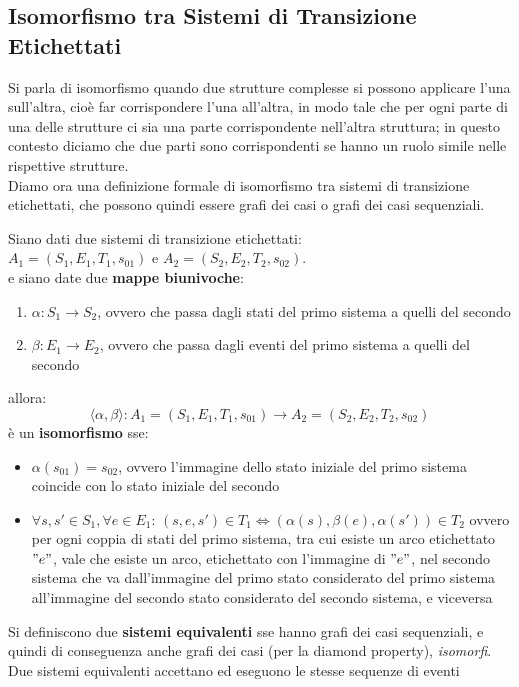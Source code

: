 \subsection{Isomorfismo tra Sistemi di Transizione Etichettati}
Si parla di isomorfismo quando due strutture complesse si possono
    applicare l'una sull'altra, cioè far corrispondere l'una all'altra, in modo
    tale che per ogni parte di una delle strutture ci sia una parte
    corrispondente nell'altra struttura; in questo contesto diciamo che due
    parti sono corrispondenti se hanno un ruolo simile nelle rispettive
    strutture.\\
Diamo ora una definizione formale di isomorfismo tra sistemi di transizione
etichettati, che possono quindi essere grafi dei casi o grafi dei casi
sequenziali.
\begin{definizione}
  Siano dati due sistemi di transizione etichettati:\\
  $A_1 = (S_1, E_1, T_1, s_{01})$ e $A_2 = (S_2 , E_2 , T_2 , s_{02})$.\\
  e siano date due \textbf{mappe biunivoche}:
  \begin{enumerate}
    \item $\alpha:S_1\to S_2$, ovvero che passa dagli stati del primo sistema a
    quelli del secondo
    \item $\beta:E_1\to E_2$, ovvero che passa dagli eventi del primo sistema a
    quelli del secondo
  \end{enumerate}
  allora:
  \[\langle \alpha,\beta\rangle:A_1= (S_1 , E_1 , T_1 , s_{01})\to A_2 = (S_2 ,
    E_2 , T_2 , s_{02})\]
  è un \textbf{isomorfismo} sse:
  \begin{itemize}
    \item $\alpha(s_{01})=s_{02}$, ovvero l'immagine dello stato iniziale del
    primo sistema coincide con lo stato iniziale del secondo
    \item $\forall s, s'\in S_1,\forall e\in E_1:\,(s, e, s')\in T_1
    \Leftrightarrow (\alpha(s),\beta(e),\alpha(s'))\in T_2$ ovvero per ogni
    coppia di stati del primo sistema, tra cui esiste un arco etichettato $"e"$,
    vale che esiste un arco, etichettato con l'immagine di $"e"$, nel secondo
    sistema che va dall'immagine del primo stato considerato del primo sistema
    all'immagine del secondo stato considerato del secondo sistema, e viceversa
  \end{itemize}
\end{definizione} \vspace{5mm} %
\begin{definizione}
  Si definiscono due \textbf{sistemi equivalenti} sse hanno grafi dei casi
  sequenziali, e quindi di conseguenza anche grafi dei casi (per la diamond property), \emph{isomorfi}.\\
  Due sistemi equivalenti accettano ed eseguono le stesse sequenze di eventi
\end{definizione} \vspace{5mm} %
